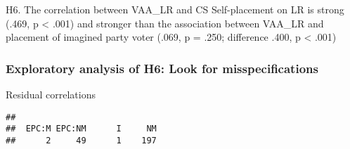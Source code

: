 \documentclass[
]{article}
\newenvironment{Shaded}{\begin{snugshade}}{\end{snugshade}}
\newcommand{\CommentTok}[1]{\textcolor[rgb]{0.56,0.35,0.01}{\textit{#1}}}
\newcommand{\DataTypeTok}[1]{\textcolor[rgb]{0.13,0.29,0.53}{#1}}
\newcommand{\DecValTok}[1]{\textcolor[rgb]{0.00,0.00,0.81}{#1}}
\newcommand{\KeywordTok}[1]{\textcolor[rgb]{0.13,0.29,0.53}{\textbf{#1}}}
\newcommand{\NormalTok}[1]{#1}
\newcommand{\OperatorTok}[1]{\textcolor[rgb]{0.81,0.36,0.00}{\textbf{#1}}}
\newcommand{\StringTok}[1]{\textcolor[rgb]{0.31,0.60,0.02}{#1}}
\begin{document}
H6. The correlation between VAA\_LR and CS Self-placement on LR is
strong (.469, p \textless{} .001) and stronger than the association
between VAA\_LR and placement of imagined party voter (.069, p = .250;
difference .400, p \textless{} .001)

\hypertarget{exploratory-analysis-of-h6-look-for-misspecifications}{%
\subsubsection{Exploratory analysis of H6: Look for
misspecifications}\label{exploratory-analysis-of-h6-look-for-misspecifications}}

Residual correlations

\begin{Shaded}
\end{Shaded}

\begin{verbatim}
## 
##  EPC:M EPC:NM      I     NM 
##      2     49      1    197
\end{verbatim}
\end{document}
